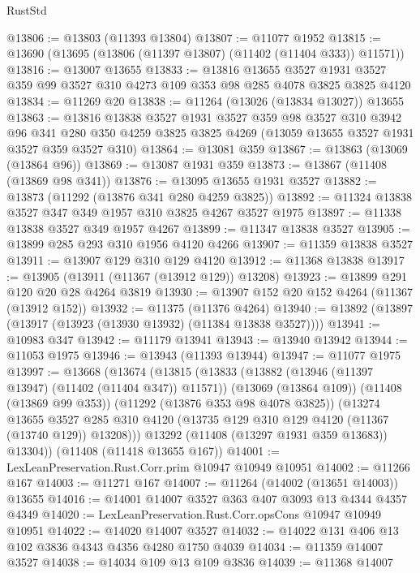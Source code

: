 \begin{lexlean}{RustStd}
\begin{coremodule}
@13806 := @13803 (@11393 @13804)
@13807 := @11077 @1952
@13815 := @13690 (@13695 (@13806 (@11397 @13807) (@11402 (@11404 @333)) @11571))
@13816 := @13007 @13655
@13833 := @13816
    @13655
    @3527
    @1931
    @3527
    @359
    @99
    @3527
    @310
    @4273
    @109
    @353
    @98
    @285
    @4078
    @3825
    @3825
    @4120
@13834 := @11269 @20
@13838 := @11264 (@13026 (@13834 @13027)) @13655
@13863 := @13816
    @13838
    @3527
    @1931
    @3527
    @359
    @98
    @3527
    @310
    @3942
    @96
    @341
    @280
    @350
    @4259
    @3825
    @3825
    @4269
    (@13059 @13655 @3527 @1931 @3527 @359 @3527 @310)
@13864 := @13081 @359
@13867 := @13863 (@13069 (@13864 @96))
@13869 := @13087 @1931 @359
@13873 := @13867 (@11408 (@13869 @98 @341))
@13876 := @13095 @13655 @1931 @3527
@13882 := @13873 (@11292 (@13876 @341 @280 @4259 @3825))
@13892 := @11324 @13838 @3527 @347 @349 @1957 @310 @3825 @4267 @3527 @1975
@13897 := @11338 @13838 @3527 @349 @1957 @4267
@13899 := @11347 @13838 @3527
@13905 := @13899 @285 @293 @310 @1956 @4120 @4266
@13907 := @11359 @13838 @3527
@13911 := @13907 @129 @310 @129 @4120
@13912 := @11368 @13838
@13917 := @13905 (@13911 (@11367 (@13912 @129)) @13208)
@13923 := @13899 @291 @120 @20 @28 @4264 @3819
@13930 := @13907 @152 @20 @152 @4264 (@11367 (@13912 @152))
@13932 := @11375 (@11376 @4264)
@13940 := @13892 (@13897 (@13917 (@13923 (@13930 @13932) (@11384 @13838 @3527))))
@13941 := @10983 @347
@13942 := @11179 @13941
@13943 := @13940 @13942
@13944 := @11053 @1975
@13946 := @13943 (@11393 @13944)
@13947 := @11077 @1975
@13997 := @13668
    (@13674
      (@13815
        (@13833
          (@13882 (@13946 (@11397 @13947) (@11402 (@11404 @347)) @11571))
          (@13069 (@13864 @109))
          (@11408 (@13869 @99 @353))
          (@11292 (@13876 @353 @98 @4078 @3825))
          (@13274
            @13655
            @3527
            @285
            @310
            @4120
            (@13735 @129 @310 @129 @4120 (@11367 (@13740 @129)) @13208)))
        @13292
        (@11408 (@13297 @1931 @359 @13683))
        @13304))
    (@11408 (@11418 @13655 @167))
@14001 := LexLeanPreservation.Rust.Corr.prim @10947 @10949 @10951
@14002 := @11266 @167
@14003 := @11271 @167
@14007 := @11264 (@14002 (@13651 @14003)) @13655
@14016 := @14001 @14007 @3527 @363 @407 @3093 @13 @4344 @4357 @4349
@14020 := LexLeanPreservation.Rust.Corr.opsCons @10947 @10949 @10951
@14022 := @14020 @14007 @3527
@14032 := @14022 @131 @406 @13 @102 @3836 @4343 @4356 @4280 @1750 @4039
@14034 := @11359 @14007 @3527
@14038 := @14034 @109 @13 @109 @3836
@14039 := @11368 @14007

\end{coremodule}
\end{lexlean}
